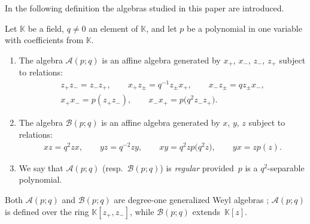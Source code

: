 \documentclass[pdftex]{sigma}
\numberwithin{equation}{section}
\def\Weyl#1#2{{\mathcal{B}}(#1;#2)}
\def\AWeyl#1#2{{\mathcal{A}}(#1;#2)}
\begin{document}
In the following def\/inition the algebras studied in this paper are introduced.

\begin{Definition}\label{def.Weyl}
Let ${\mathbb K}$ be a f\/ield, $q\neq 0$ an element of ${\mathbb K}$, and let $p$ be a polynomial in one variable with coef\/f\/icients from ${\mathbb K}$.

\begin{enumerate}\itemsep=0pt
\item[(1)] The algebra $\AWeyl p q$ is an af\/f\/ine algebra generated by $x_+$, $x_-$, $z_-$, $z_+$ subject to relations:
\begin{subequations}\label{a.weyl}
\begin{gather}
z_+ z_- = z_-z_+, \qquad x_+z_{\pm} = q^{-1}z_\pm x_+ , \qquad x_-z_{\pm} = qz_\pm x_-, \label{a.weyl1}\\
x_+x_- = p(z_+z_-), \qquad x_-x_+ = p\big(q^2z_-z_+\big). \label{a.weyl2}
\end{gather}
\end{subequations}

\item[(2)] The algebra $\Weyl p q$ is an af\/f\/ine algebra generated by $x$, $y$, $z$ subject to relations:
\begin{gather*}%
 xz = q^2 z x , \qquad yz = q^{-2}zy, \qquad xy = q^2 zp\big(q^2z\big), \qquad yx = zp(z).
\end{gather*}
\item[(3)] We say that $\AWeyl p q$ (resp.\ $\Weyl p q$) is {\em regular} provided~$p$ is a $q^2$-separable polynomial.
\end{enumerate}
\end{Definition}

Both $\AWeyl p q$ and $\Weyl p q$ are degree-one generalized Weyl algebras \cite{Bav:gweyl}; $\AWeyl p q$ is def\/ined over the ring ${\mathbb K}[z_+, z_-]$, while $\Weyl p q$ extends~${\mathbb K}[z]$.
\end{document}

